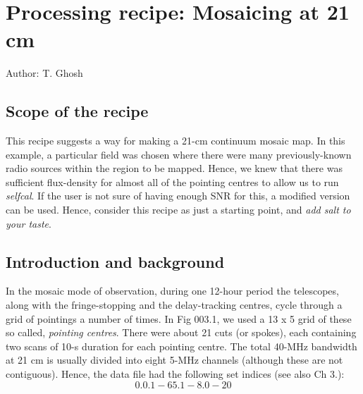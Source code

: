 %
%
%
%
\chapter{Processing recipe: Mosaicing at 21 cm}
\tableofcontents

Author: T. Ghosh

\section{Scope of the recipe}
\label{.scope}

This recipe suggests a way for making a 21-cm continuum mosaic map. In this
example, a particular field was chosen where there were many previously-known
radio sources within the region to be mapped. Hence, we knew that there was
sufficient flux-density for almost all of the pointing centres to allow  us to
run {\it selfcal}. If the user is not sure of having enough SNR for this, a
modified version can be used.  Hence, consider this recipe as just a starting
point, and {\it add salt to your taste}.




\section{Introduction and background}
\label{.intro}

In the mosaic mode of observation, during one 12-hour period the telescopes,
along with the fringe-stopping and the delay-tracking centres, cycle through a
grid of pointings a number of times. In Fig 003.1, we used a 13 x 5 grid of
these so called, {\it pointing centres}. There were about 21 cuts (or spokes),
each containing two scans of 10-s duration for each pointing centre. The total
40-MHz bandwidth at 21 cm is usually divided into eight 5-MHz channels
(although these are not contiguous). Hence, the data file had the following set
indices (see also Ch 3.):  $$0.0.1-65.1-8.0-20$$


